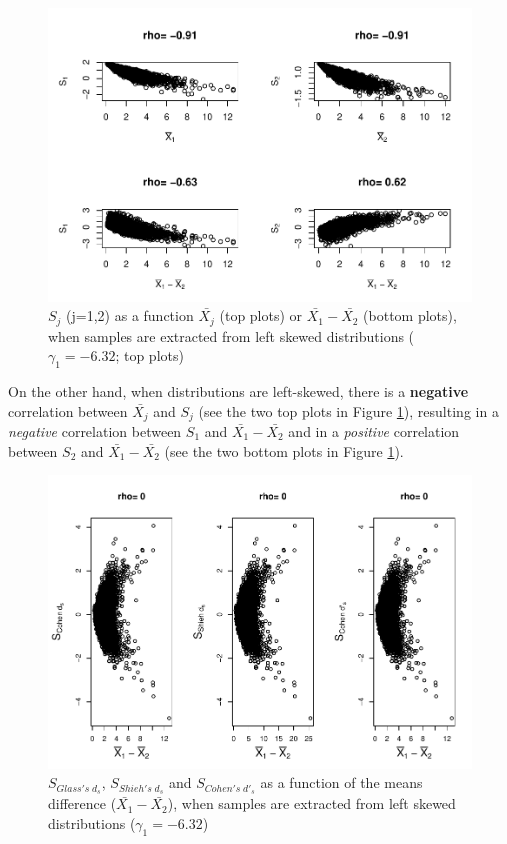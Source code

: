 \documentclass[
  man]{apa6}
\begin{document}
\begin{figure}
\centering
\includegraphics{Correlations-between-the-sample-means-difference-and-standardizers-of-all-estimators,-and-implications-on-biases-and-variances-of-all-estimators_files/figure-latex/SDC1Ls-1.pdf}
\caption{\label{fig:SDC1Ls}\(S_j\) (j=1,2) as a function \(\bar{X_j}\) (top plots) or \(\bar{X_1}-\bar{X_2}\) (bottom plots), when samples are extracted from left skewed distributions (\(\gamma_1 = -6.32\); top plots)}
\end{figure}

On the other hand, when distributions are left-skewed, there is a \textbf{negative} correlation between \(\bar{X_j}\) and \(S_j\) (see the two top plots in Figure \ref{fig:SDC1Ls}), resulting in a \emph{negative} correlation between \(S_1\) and \(\bar{X_1}-\bar{X_2}\) and in a \emph{positive} correlation between \(S_2\) and \(\bar{X_1}-\bar{X_2}\) (see the two bottom plots in Figure \ref{fig:SDC1Ls}).

\begin{figure}
\centering
\includegraphics{Correlations-between-the-sample-means-difference-and-standardizers-of-all-estimators,-and-implications-on-biases-and-variances-of-all-estimators_files/figure-latex/StdzrC1Ls-1.pdf}
\caption{\label{fig:StdzrC1Ls}\(S_{Glass's \; d_s}\), \(S_{Shieh's \; d_s}\) and \(S_{Cohen's \; d'_s}\) as a function of the means difference (\(\bar{X_1}-\bar{X_2}\)), when samples are extracted from left skewed distributions (\(\gamma_1 = -6.32\))}
\end{figure}
\end{document}
